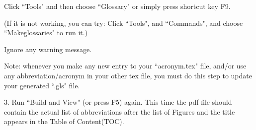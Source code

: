 Click ``Tools" and then choose ``Glossary" or simply press shortcut key F9. 

(If it is not working, you can try: Click ``Tools", and 
``Commands", and choose ``Makeglossaries" to run it.) 

Ignore any warning message.

Note: whenever you make any new entry to your ``acronym.tex" file, and/or use any abbreviation/acronym in your other tex file, you must do this step to update your generated ``.gls" file.   

3. Run ``Build and View" (or press F5) again. 
This time the pdf file should contain the actual list of abbreviations after the list of Figures and the title appears in the Table of Content(TOC).
          




